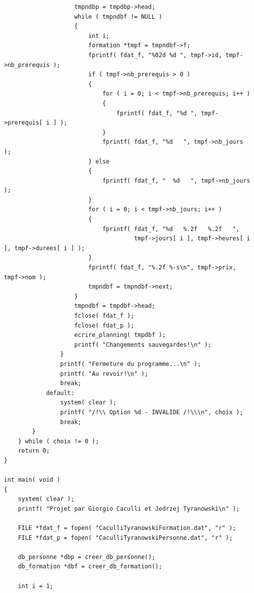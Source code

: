 \documentclass[11pt]{article}
\begin{document}
\begin{lstlisting}
                    tmpndbp = tmpdbp->head;
                    while ( tmpndbf != NULL )
                    {
                        int i;
                        formation *tmpf = tmpndbf->f;
                        fprintf( fdat_f, "%02d %d ", tmpf->id, tmpf->nb_prerequis );
                        if ( tmpf->nb_prerequis > 0 )
                        {
                            for ( i = 0; i < tmpf->nb_prerequis; i++ )
                            {
                                fprintf( fdat_f, "%d ", tmpf->prerequis[ i ] );
                            }
                            fprintf( fdat_f, "%d   ", tmpf->nb_jours );
                        } else
                        {
                            fprintf( fdat_f, "  %d   ", tmpf->nb_jours );
                        }
                        for ( i = 0; i < tmpf->nb_jours; i++ )
                        {
                            fprintf( fdat_f, "%d   %.2f   %.2f   ",
                                     tmpf->jours[ i ], tmpf->heures[ i ], tmpf->durees[ i ] );
                        }
                        fprintf( fdat_f, "%.2f %-s\n", tmpf->prix, tmpf->nom );
                        tmpndbf = tmpndbf->next;
                    }
                    tmpndbf = tmpdbf->head;
                    fclose( fdat_f );
                    fclose( fdat_p );
                    ecrire_planning( tmpdbf );
                    printf( "Changements sauvegardes!\n" );
                }
                printf( "Fermeture du programme...\n" );
                printf( "Au revoir!\n" );
                break;
            default:
                system( clear );
                printf( "/!\\ Option %d - INVALIDE /!\\\n", choix );
                break;
        }
    } while ( choix != 0 );
    return 0;
}

int main( void )
{
    system( clear );
    printf( "Projet par Giorgio Caculli et Jedrzej Tyranowski\n" );

    FILE *fdat_f = fopen( "CaculliTyranowskiFormation.dat", "r" );
    FILE *fdat_p = fopen( "CaculliTyranowskiPersonne.dat", "r" );

    db_personne *dbp = creer_db_personne();
    db_formation *dbf = creer_db_formation();

    int i = 1;


\end{lstlisting}
\end{document}
